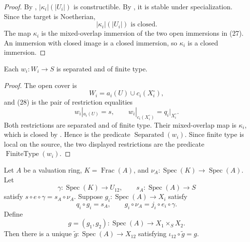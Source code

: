 \begin{proof}
  By ,
  $|\kappa_i|(|U_i|)$ is constructible.  By
  , it is stable
  under specialization.  Since the target is Noetherian,
  \[
    |\kappa_i|(|U_i|)\text{ is closed}.
  \]
  The map $\kappa_i$ is the mixed-overlap immersion of the two open
  immersions in (27).  An immersion with closed image is a closed immersion,
  so $\kappa_i$ is a closed immersion.
\end{proof}

\begin{lemma}
  \label{lemma:nagata-intermediate-separated}
  \lean{}

  Each $w_i\colon W_i\to S$ is separated and of finite type.
\end{lemma}

\begin{proof}
  The open cover is
  \[
    W_i=a_i(U)\cup c_i(X_i^\circ),
  \]
  and (28) is the pair of restriction equalities
  \[
    w_i|_{a_i(U)}=s,\qquad
    w_i|_{c_i(X_i^\circ)}=q_i|_{X_i^\circ}.
  \]
  Both restrictions are separated and of finite type.  Their mixed-overlap
  map is $\kappa_i$, which is closed by
  .  Hence
   is the predicate
  $\operatorname{Separated}(w_i)$.  Since finite type is local on the source,
  the two displayed restrictions are the predicate
  $\operatorname{FiniteType}(w_i)$.
\end{proof}

\begin{lemma}
  \label{lemma:nagata-valuation-pair-factors-comparison}
  \lean{}

  Let $A$ be a valuation ring, $K=\operatorname{Frac}(A)$, and
  $\nu_A\colon\operatorname{Spec}(K)\to\operatorname{Spec}(A)$.  Let
  \[
    \gamma\colon\operatorname{Spec}(K)\to U_{12},\qquad
    s_A\colon\operatorname{Spec}(A)\to S
  \]
  satisfy $s\circ e\circ\gamma=s_A\circ\nu_A$.  Suppose
  $g_i\colon\operatorname{Spec}(A)\to X_i$ satisfy
  \[
    q_i\circ g_i=s_A,\qquad
    g_i\circ\nu_A=j_i\circ e_i\circ\gamma.
  \]
  Define
  \[
    g=(g_1,g_2)\colon\operatorname{Spec}(A)\to X_1\times_SX_2.
  \]
  Then there is a unique
  $\widetilde g\colon\operatorname{Spec}(A)\to X_{12}$ satisfying
  $\iota_{12}\circ\widetilde g=g$.
\end{lemma}

